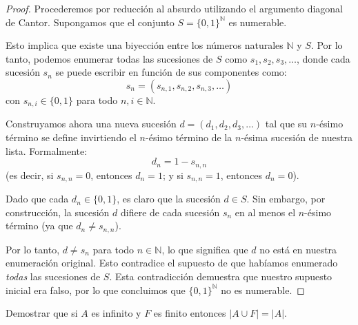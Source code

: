 \documentclass{article}
\theoremstyle{definition}
\newcommand{\N}{\mathbb{N}}
\newenvironment{ejercicio}[1]{\begin{trivlist}
\item[\hskip \labelsep {\bfseries Ejercicio}\hskip \labelsep {\bfseries #1.}]}{\end{trivlist}}
\begin{document}
\begin{proof}
    Procederemos por reducción al absurdo utilizando el argumento diagonal de Cantor. Supongamos que el conjunto \( S = {\{0,1\}}^\N \) es numerable.

    Esto implica que existe una biyección entre los números naturales \( \N \) y \( S \). Por lo tanto, podemos enumerar todas las sucesiones de \(S\) como \(s_1, s_2, s_3, \dots \), donde cada sucesión \(s_n\) se puede escribir en función de sus componentes como:
    \[s_n = (s_{n,1}, s_{n,2}, s_{n,3}, \dots)\]
    con \( s_{n,i} \in \{0,1\} \) para todo \(n, i \in \N\).

    Construyamos ahora una nueva sucesión \(d = (d_1, d_2, d_3, \dots)\) tal que su \(n\)-ésimo término se define invirtiendo el \(n\)-ésimo término de la \(n\)-ésima sucesión de nuestra lista. Formalmente:
    \[d_n = 1 - s_{n,n}\]
    (es decir, si \(s_{n,n} = 0\), entonces \(d_n = 1\); y si \(s_{n,n} = 1\), entonces \(d_n = 0\)).

    Dado que cada \(d_n \in \{0,1\} \), es claro que la sucesión \(d \in S\). Sin embargo, por construcción, la sucesión \(d\) difiere de cada sucesión \(s_n\) en al menos el \(n\)-ésimo término (ya que \(d_n \neq s_{n,n}\)).

    Por lo tanto, \( d \neq s_n \) para todo \(n \in \N \), lo que significa que \(d\) no está en nuestra enumeración original. Esto contradice el supuesto de que habíamos enumerado \emph{todas} las sucesiones de \(S\). Esta contradicción demuestra que nuestro supuesto inicial era falso, por lo que concluimos que \( {\{0,1\}}^\N \) no es numerable.
\end{proof}

\begin{ejercicio}{12}
    Demostrar que si \(A\) es infinito y \(F\) es finito entonces \(|A\cup F|=|A|\).
\end{ejercicio}
\end{document}
